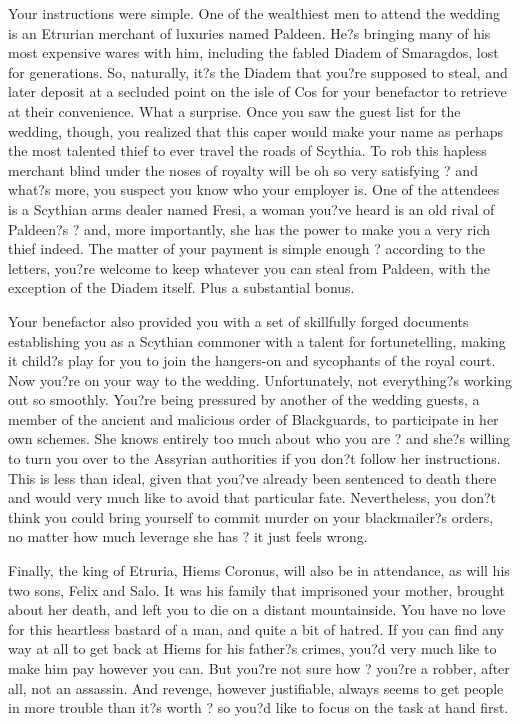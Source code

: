 \documentclass[char]{Kos}
\begin{document}
    Your instructions were simple. One of the wealthiest men to attend the wedding is an Etrurian merchant of luxuries named Paldeen. He?s bringing many of his most expensive wares with him, including the fabled Diadem of Smaragdos, lost for generations. So, naturally, it?s the Diadem that you?re supposed to steal, and later deposit at a secluded point on the isle of Cos for your benefactor to retrieve at their convenience. What a surprise. Once you saw the guest list for the wedding, though, you realized that this caper would make your name as perhaps the most talented thief to ever travel the roads of Scythia. To rob this hapless merchant blind under the noses of royalty will be oh so very satisfying ? and what?s more, you suspect you know who your employer is. One of the attendees is a Scythian arms dealer named Fresi, a woman you?ve heard is an old rival of Paldeen?s ? and, more importantly, she has the power to make you a very rich thief indeed. The matter of your payment is simple enough ? according to the letters, you?re welcome to keep whatever you can steal from Paldeen, with the exception of the Diadem itself. Plus a substantial bonus.

    Your benefactor also provided you with a set of skillfully forged documents establishing you as a Scythian commoner with a talent for fortunetelling, making it child?s play for you to join the hangers-on and sycophants of the royal court. Now you?re on your way to the wedding. Unfortunately, not everything?s working out so smoothly. You?re being pressured by another of the wedding guests, a member of the ancient and malicious order of Blackguards, to participate in her own schemes. She knows entirely too much about who you are ? and she?s willing to turn you over to the Assyrian authorities if you don?t follow her instructions. This is less than ideal, given that you?ve already been sentenced to death there and would very much like to avoid that particular fate. Nevertheless, you don?t think you could bring yourself to commit murder on your blackmailer?s orders, no matter how much leverage she has ? it just feels wrong. 

    Finally, the king of Etruria, Hiems Coronus, will also be in attendance, as will his two sons, Felix and Salo. It was his family that imprisoned your mother, brought about her death, and left you to die on a distant mountainside. You have no love for this heartless bastard of a man, and quite a bit of hatred. If you can find any way at all to get back at Hiems for his father?s crimes, you?d very much like to make him pay however you can. But you?re not sure how ? you?re a robber, after all, not an assassin. And revenge, however justifiable, always seems to get people in more trouble than it?s worth ? so you?d like to focus on the task at hand first. 
\end{document}
